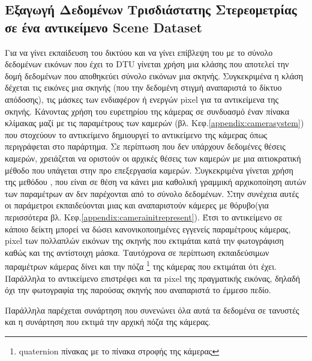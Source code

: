 \subsection{Εξαγωγή Δεδομένων Τρισδιάστατης Στερεομετρίας σε ένα αντικείμενο Scene Dataset}
Για να γίνει εκπαίδευση του δικτύου και να γίνει επίβλεψη του με το σύνολο δεδομένων εικόνων που έχει το DTU γίνεται χρήση μια κλάσης που αποτελεί την δομή δεδομένων που αποθηκεύει σύνολο εικόνων μια σκηνής. Συγκεκριμένα η κλάση  δέχεται τις εικόνες μια σκηνής (που την δεδομένη στιγμή αναπαριστά το δίκτυο απόδοσης), τις μάσκες των ενδιαφέρον ή ενεργών pixel για τα αντικείμενα της σκηνής. Κάνοντας χρήση του ευρετηρίου της κάμερας σε συνδυασμό έναν πίνακα κλίμακας  μαζί με τις παραμέτρους των καμερών (βλ. Κεφ.\ref{appendix:camerasystem}) που στοχεύουν το αντικείμενο δημιουργεί το αντικείμενο της κάμερας όπως περιγράφεται στο παράρτημα. Σε περίπτωση που δεν υπάρχουν δεδομένες θέσεις καμερών,  χρειάζεται να οριστούν οι αρχικές θέσεις των καμερών με μια αιτιοκρατική μέθοδο που υπάγεται στην προ επεξεργασία καμερών. Συγκεκριμένα γίνεται χρήση της μεθόδου \cite{jiang2013global}, που είναι σε θέση να κάνει μια καθολική γραμμική αρχικοποίηση αυτών των παραμέτρων αν δεν παρέχονται από το σύνολο δεδομένων. Στην συνέχεια αυτές οι παράμετροι εκπαιδεύονται μιας και αναπαριστούν κάμερες με θόρυβο(για περισσότερα βλ. Κεφ.\ref{appendix:camerainitrepresent}). Έτσι το αντικείμενο σε κάποιο δείκτη μπορεί να δώσει κανονικοποιημένες εγγενείς παραμέτρους κάμερας, pixel των πολλαπλών εικόνων της σκηνής που εκτιμάται κατά την φωτογράφιση καθώς και της αντίστοιχη μάσκα. Ταυτόχρονα σε περίπτωση εκπαιδεύσιμων παραμέτρων κάμερας δίνει και την πόζα \footnote{quaternion πίνακας με το πίνακα στροφής της κάμερας} της κάμερας που εκτιμάται ότι έχει. Παράλληλα το αντικείμενο επιστρέφει και τα pixel της πραγματικής εικόνας, δηλαδή όχι την φωτογραφία της παρούσας σκηνής που αναπαριστά το έμμεσο πεδίο. 

Παράλληλα παρέχεται συνάρτηση που συνενώνει όλα αυτά τα δεδομένα σε τανυστές και η συνάρτηση που εκτιμά την αρχική πόζα της κάμερας.  